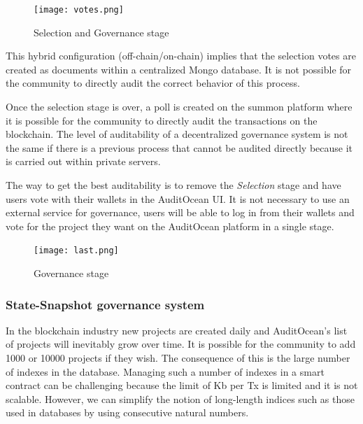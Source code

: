 \documentclass[9pt]{article}
\begin{document}
\begin{figure}[ht]
  \centering
  \texttt{[image: votes.png]}
  \caption{Selection and Governance stage
  }
  \label{fig:mi_imagen}
\end{figure}
This hybrid configuration (off-chain/on-chain) implies that the selection votes are created as documents within a centralized Mongo database. It is not possible for the community to directly audit the correct behavior of this process.

Once the selection stage is over, a poll is created on the summon platform where it is possible for the community to directly audit the transactions on the blockchain. The level of auditability of a decentralized governance system is not the same if there is a previous process that cannot be audited directly because it is carried out within private servers.

The way to get the best auditability is to remove the \emph{Selection} stage and have users vote with their wallets in the AuditOcean UI. It is not necessary to use an external service for governance, users will be able to log in from their wallets and vote for the project they want on the AuditOcean platform in a single stage.

\begin{figure}[ht]
  \centering
  \texttt{[image: last.png]}
  \caption{Governance stage
  }
  \label{fig:mi_imagen}
\end{figure}



\subsubsection { State-Snapshot governance system } 


In the blockchain industry new projects are created daily and AuditOcean's list of projects will inevitably grow over time. It is possible for the community to add 1000 or 10000 projects if they wish. The consequence of this is the large number of indexes in the database. Managing such a number of indexes in a smart contract can be challenging because the limit of Kb per Tx is limited and it is not scalable. However, we can simplify the notion of long-length indices such as those used in databases by using consecutive natural numbers.
\end{document}
